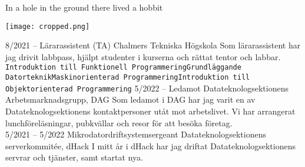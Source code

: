 \documentclass[9pt]{developercv} %
\begin{document}
\vspace{0.5cm}



\begin{minipage}[t]{0.8\textwidth} %
	\vspace{-\baselineskip} %

	In a hole in the ground there lived a hobbit
\end{minipage}
\hfill %
\begin{minipage}[t]{0.2\textwidth} %
	\vspace{-\baselineskip} %
	\texttt{[image: cropped.png]}
\end{minipage}



\begin{entrylist}
	\entry
		{8/2021 -- }
		{Lärarassistent (TA)}
		{Chalmers Tekniska Högskola}
		{Som lärarassistent har jag drivit labbpass, hjälpt studenter i
		kurserna och rättat tentor och labbar.\\ \texttt{Introduktion
		till Funktionell Programmering}\slashsep\texttt{Grundläggande
		Datorteknik}\slashsep\texttt{Maskinorienterad
		Programmering}\slashsep\texttt{Introduktion till
		Objektorienterad Programmering}}
	\entry
		{5/2022 -- }
		{Ledamot}
		{Datateknologsektionens Arbetsmarknadsgrupp, DAG}
		{Som ledamot i DAG har jag varit en av Datateknologsektionens
		kontaktpersoner utåt mot arbetslivet. Vi har arrangerat
		lunchföreläsningar, pubkvällar och resor för att besöka
		företag.\\}
	\entry
		{5/2021 -- 5/2022}
		{Mikrodatordriftsystemsergeant}
		{Datateknologsektionens serverkommitée, dHack}
		{I mitt år i dHack har jag driftat Datateknologsektionens
		servrar och tjänster, samt startat nya.\\}
\end{entrylist}
\end{document}
